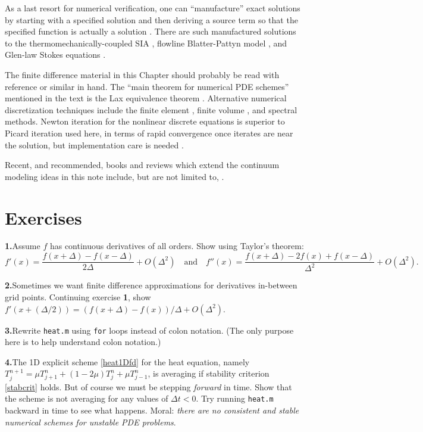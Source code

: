 \documentclass[letterpaper,final,12pt,reqno]{amsart}
\begin{document}
As a last resort for numerical verification, one can ``manufacture'' exact solutions by starting with a specified solution and then deriving a source term so that the specified function is actually a solution \cite{Roache}.  There are such manufactured solutions to the thermomechanically-coupled SIA \cite{BBL}, flowline Blatter-Pattyn model \cite{GlowinskiRappaz}, and Glen-law Stokes equations \cite{JouvetRappaz2011,Lengetal2012,SargentFastook2010}.

The finite difference material in this Chapter should probably be read with reference \cite{MortonMayers} or similar in hand.  The ``main theorem for numerical PDE schemes'' mentioned in the text is the Lax equivalence theorem \cite{MortonMayers}.  Alternative numerical discretization techniques include the finite element \cite{Braess}, finite volume \cite{LeVeque}, and spectral \cite{Trefethen} methods.  Newton iteration for the nonlinear discrete equations is superior to Picard iteration used here, in terms of rapid convergence once iterates are near the solution, but implementation care is needed \cite{Kelley}.

Recent, and recommended, books and reviews which extend the continuum modeling ideas in this note include, but are not limited to, \cite{CuffeyPaterson,GreveBlatter2009,SchoofHewitt2013,vanderVeen}.


\footnotesize




\clearpage\newpage
\small
\section*{Exercises}

\newcommand{\exer}[2]{\medskip\noindent \textbf{#1.}\quad #2}

\exer{1}{Assume $f$ has continuous derivatives of all orders.  Show using Taylor's theorem:
  $$f'(x) = \frac{f(x+\Delta) - f(x-\Delta)}{2\Delta} + O(\Delta^2) \quad \text{and} \quad f''(x) = \frac{f(x+\Delta) - 2 f(x) + f(x-\Delta)}{\Delta^2} + O(\Delta^2).$$}

\exer{2}{Sometimes we want finite difference approximations for derivatives in-between grid points.  Continuing exercise \textbf{1}, show $f'(x+(\Delta/2)) = (f(x+\Delta) - f(x))/\Delta + O(\Delta^2)$.}

\exer{3}{Rewrite \texttt{heat.m} using \texttt{for} loops instead of colon notation.  (The only purpose here is to help understand colon notation.)}

\exer{4}{The 1D explicit scheme \eqref{heat1Dfd} for the heat equation, namely $T_j^{n+1} = \mu T_{j+1}^n + (1 - 2 \mu) T_j^n + \mu T_{j-1}^n$, is averaging if stability criterion \eqref{stabcrit} holds.  But of course we must be stepping \emph{forward} in time.  Show that the scheme is not averaging for any values of $\Delta t < 0$.  Try running \texttt{heat.m} backward in time to see what happens.  Moral: \emph{there are no consistent and stable numerical schemes for unstable PDE problems}.}
\end{document}
